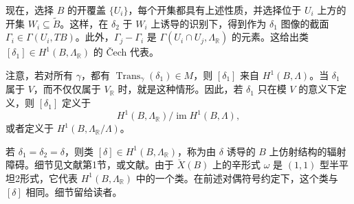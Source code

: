 \begin{construction}
现在，选择 $B$ 的开覆盖 $\{U_i\}$，每个开集都具有上述性质，并选择位于 $U_i$ 上方的开集 $W_i\subseteq\widetilde B$。这样，在 $\delta_2$ 于 $W_i$ 上诱导的识别下，得到作为 $\delta_1$ 图像的截面 $\Gamma_i\in\Gamma(U_i,TB)$。此外，$\Gamma_j-\Gamma_i$ 是 $\Gamma(U_i\cap U_j,\Lambda_{\mathbb R})$ 的元素。这给出类 $[\delta_1]\in H^1(B,\Lambda_{\mathbb R})$ 的 Čech 代表。

注意，若对所有 $\gamma$，都有 $\operatorname{Trans}_\gamma(\delta_1)\in M$，则 $[\delta_1]$ 来自 $H^1(B,\Lambda)$。当 $\delta_1$ 属于 $V$，而不仅仅属于 $V_{\mathbb R}$ 时，就是这种情形。因此，若 $\delta_1$ 只在模 $V$ 的意义下定义，则 $[\delta_1]$ 定义于
\[
H^1(B,\Lambda_{\mathbb R})/\operatorname{im}H^1(B,\Lambda),
\]
或者定义于 $H^1(B,\Lambda_{\mathbb R}/\Lambda)$。\BookQED
\end{construction}

\begin{note}[numbered]\label{note:6.30}
若 $\delta_1=\delta_2=\delta$，则类 $[\delta]\in H^1(B,\Lambda_{\mathbb R})$，称为由 $\delta$ 诱导的 $B$ 上仿射结构的辐射障碍。细节见文献第1节，或文献。由于 $\check X(B)$ 上的辛形式 $\omega$ 是 $(1,1)$ 型半平坦2形式，它代表 $H^1(B,\Lambda_{\mathbb R})$ 中的一个类。在前述对偶符号约定下，这个类与 $[\delta]$ 相同。细节留给读者。
\end{note}

